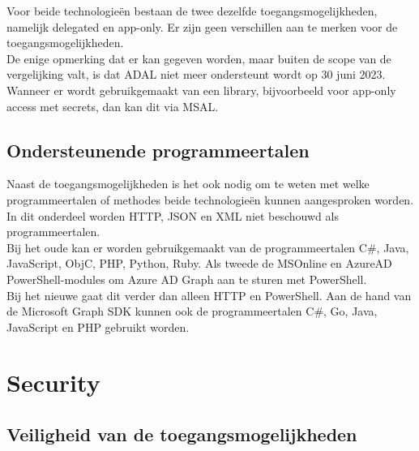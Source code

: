 Voor beide technologieën bestaan de twee dezelfde toegangsmogelijkheden, namelijk delegated en app-only. Er zijn geen verschillen aan te merken voor de toegangsmogelijkheden. \\

De enige opmerking dat er kan gegeven worden, maar buiten de scope van de vergelijking valt, is dat \ac{ADAL} niet meer ondersteunt wordt op 30 juni 2023. Wanneer er wordt gebruikgemaakt van een library, bijvoorbeeld voor app-only access met secrets, dan kan dit via \ac{MSAL}.

\subsection{Ondersteunende programmeertalen}





Naast de toegangsmogelijkheden is het ook nodig om te weten met welke programmeertalen of methodes beide technologieën kunnen aangesproken worden. In dit onderdeel worden \Ac{HTTP}, \Ac{JSON} en \Ac{XML} niet beschouwd als programmeertalen. \\

Bij het oude kan er worden gebruikgemaakt van de programmeertalen C\#, Java, JavaScript, ObjC, PHP, Python, Ruby. Als tweede de MSOnline en AzureAD PowerShell-modules om Azure \ac{AD} Graph aan te sturen met PowerShell. \\

Bij het nieuwe gaat dit verder dan alleen \ac{HTTP} en PowerShell. Aan de hand van de Microsoft Graph \ac{SDK} kunnen ook de programmeertalen C\#, Go, Java, JavaScript en PHP gebruikt worden. \\


\section{Security}

\subsection{Veiligheid van de toegangsmogelijkheden}

